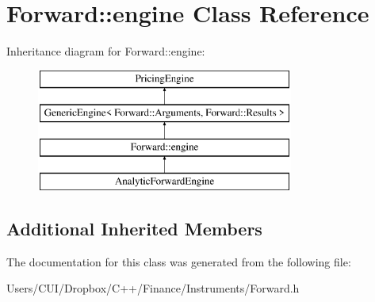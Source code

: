\hypertarget{class_forward_1_1engine}{}\section{Forward\+:\+:engine Class Reference}
\label{class_forward_1_1engine}
Inheritance diagram for Forward\+:\+:engine\+:\begin{figure}[H]
\begin{center}
\leavevmode
\includegraphics[height=4.000000cm]{class_forward_1_1engine}
\end{center}
\end{figure}
\subsection*{Additional Inherited Members}


The documentation for this class was generated from the following file\+:\begin{DoxyCompactItemize}
\item 
Users/\+C\+U\+I/\+Dropbox/\+C++/\+Finance/\+Instruments/Forward.\+h\end{DoxyCompactItemize}
